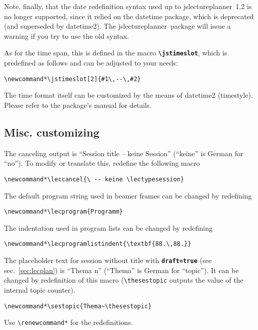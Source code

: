 \documentclass[english]{article}
\newcommand*\jmacro[1]{\textbf{\texttt{#1}}}
\newcommand*\jcsmacro[1]{\jmacro{\textbackslash{#1}}}
\newcommand*\joption[1]{\textbf{\texttt{#1}}}
\newcommand*\jfmacro[1]{\texttt{#1}}
\newcommand*\jfcsmacro[1]{\jfmacro{\textbackslash{#1}}}
\newcommand*\jparam[1]{\angus #1\angud}
\newcommand*\jslp{\textsf{jslectureplanner}}
\begin{document}
Note, finally, that the date redefinition syntax used up to \jslp\ 1.2 is no longer supported, since it relied on the \textsf{datetime} package, which is deprecated (and superseded by \textsf{datetime2}). The \jslp\ package will issue a warning if you try to use the old syntax.

As for the time span, this is defined in the macro \jcsmacro{jstimeslot}, which is predefined as follows and can be adjusted to your needs:
\begin{lstlisting}[language={[LaTeX]TeX},basicstyle={\small\ttfamily},frame=single,moretexcs={[1]{jstimeslot}}]
\newcommand*\jstimeslot[2]{#1\,--\,#2}
\end{lstlisting}
The time format itself can be customized by the means of \textsf{datetime2} (timestyle). Please refer to the package's manual for details.

\subsection{Misc. customizing}\label{sec:misccust}

The canceling output is ``Session title -- keine \jparam{Session}'' (``keine''
is German for ``no''). To modify or translate this, redefine the
following macro
\begin{lstlisting}[language={[LaTeX]TeX},basicstyle={\small\ttfamily},frame=single]
\newcommand*\leccancel{\ -- keine \lectypesession}
\end{lstlisting}
The default program string used in beamer frames can be changed by
redefining
\begin{lstlisting}[language={[LaTeX]TeX},basicstyle={\small\ttfamily},frame=single]
\newcommand*\lecprogram{Programm}
\end{lstlisting}
The indentation used in program lists can be changed by redefining
\begin{lstlisting}[language={[LaTeX]TeX},basicstyle={\small\ttfamily},frame=single]
\newcommand*\lecprogramlistindent{\textbf{88.\,88.}}
\end{lstlisting}
The placeholder text for session without title with \joption{draft=true}
(see sec.~\ref{sec:lecplan}) is ``Thema \jparam{n}'' (``Thema'' is German for ``topic'').
It can be changed by redefinition of this macro (\lstinline|\thesestopic| outputs
the value of the internal topic counter).
\begin{lstlisting}[language={[LaTeX]TeX},basicstyle={\small\ttfamily},frame=single]
\newcommand*\sestopic{Thema~\thesestopic}
\end{lstlisting}
Use \jfcsmacro{renewcommand{*}} for the redefinitions.
\end{document}
